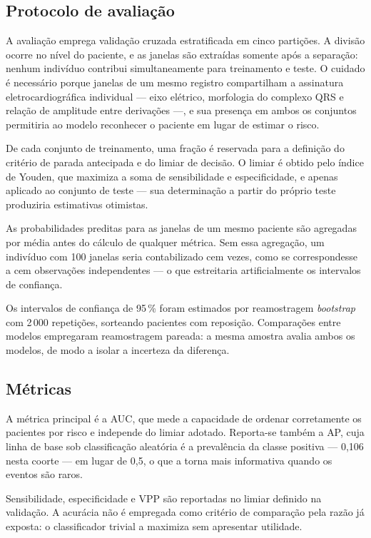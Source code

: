 \subsection{Protocolo de avaliação}
\label{subsec:config-avaliacao}

A avaliação emprega validação cruzada estratificada em cinco partições. A
divisão ocorre no nível do paciente, e as janelas são extraídas somente após
a separação: nenhum indivíduo contribui simultaneamente para treinamento e
teste. O cuidado é necessário porque janelas de um mesmo registro
compartilham a assinatura eletrocardiográfica individual --- eixo elétrico,
morfologia do complexo QRS e relação de amplitude entre derivações ---, e sua
presença em ambos os conjuntos permitiria ao modelo reconhecer o paciente em
lugar de estimar o risco.

De cada conjunto de treinamento, uma fração é reservada para a definição do
critério de parada antecipada e do limiar de decisão. O limiar é obtido pelo
índice de Youden, que maximiza a soma de sensibilidade e especificidade, e
apenas aplicado ao conjunto de teste --- sua determinação a partir do próprio
teste produziria estimativas otimistas.

As probabilidades preditas para as janelas de um mesmo paciente são
agregadas por média antes do cálculo de qualquer métrica. Sem essa agregação,
um indivíduo com 100 janelas seria contabilizado cem vezes, como se
correspondesse a cem observações independentes --- o que estreitaria
artificialmente os intervalos de confiança.

Os intervalos de confiança de 95\,\% foram estimados por reamostragem
\textit{bootstrap} com 2\,000 repetições, sorteando pacientes com reposição.
Comparações entre modelos empregaram reamostragem pareada: a mesma amostra
avalia ambos os modelos, de modo a isolar a incerteza da diferença.

\subsection{Métricas}
\label{subsec:config-metricas}

A métrica principal é a \gls{AUC}, que mede a capacidade de ordenar
corretamente os pacientes por risco e independe do limiar adotado. Reporta-se
também a \gls{AP}, cuja linha de base sob classificação aleatória é a
prevalência da classe positiva --- 0,106 nesta coorte --- em lugar de 0,5, o
que a torna mais informativa quando os eventos são raros.

Sensibilidade, especificidade e \gls{VPP} são reportadas no limiar definido
na validação. A acurácia não é empregada como critério de comparação pela
razão já exposta: o classificador trivial a maximiza sem apresentar
utilidade.

